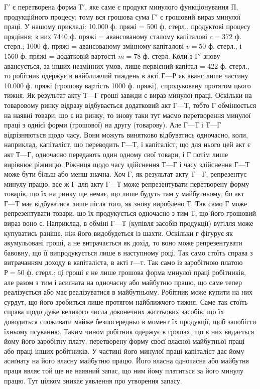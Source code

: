 $Г'$ є перетворена форма $Т'$, яке саме є продукт минулого функціонування
$П$, продукційного процесу; тому вся грошова сума $Г'$ є грошовий
вираз минулої праці. У нашому прикладі: 10.000 ф. пряжі = 500 ф. стерл.,
продуктові процесу прядіння; з них 7440 ф. пряжі = авансованому
сталому капіталові $c = 372$ ф. стерл.; 1000 ф. пряжі = авансованому
змінному капіталові $v = 50$ ф. стерл., і 1560 ф. пряжі = додатковій
вартості $m = 78$ ф. стерл. Коли з $Г'$ знову авансується, за інших незмінних
умов, лише первісний капітал = 422 ф. стерл., то робітник одержує
в найближчий тиждень в акті $Г — Р$ як аванс лише частину 10.000 ф.
пряжі (грошову вартість 1000 ф. пряжі), спродуковану протягом цього
тижня. Як результат акту $Т — Г$ гроші завжди є вираз минулої праці.
Оскільки на товаровому ринку відразу відбувається додатковий акт $Г — Т$,
тобто $Г$ обмінюється на наявні товари, що є на ринку, то знову таки
тут маємо перетворення минулої праці з однієї форми (грошової) на
другу (товарову). Але $Г — Т$ і $Т — Г$ відрізняються щодо часу. Вони
можуть винятково відбуватись одночасно, коли, наприклад, капіталіст,
що переводить $Г — Т$, і капіталіст, що для нього цей акт є акт
$Т — Г$, одночасно передають один одному свої товари, і $Г$ потім лише
вирівнює ріжницю. Ріжниця щодо часу здійснення $Т — Г$ і часу здійснення
$Г — Т$ може бути більш або менш значна. Хоч $Г$, як результат акту
$Т — Г$, репрезентує минулу працю, все ж $Г$ для акту $Г — Т$ може
репрезентувати перетворену форму товарів, що їх на ринку ще немає,
що лише будуть там у майбутньому, бо акт $Г — Т$ має відбуватися
лише після того, як знову вироблено $Т$. Так само $Г$ може
репрезентувати товари, що їх продукується одночасно з тим $Т$, що його
грошовий вираз воно є. Наприклад, в обміні $Г — Т$ (купівля засобів
продукції) вугілля може купуватись раніше, ніж його видобудеться із
шахти. Оскільки $г$ фігурує як акумульовані гроші, а не витрачається
як дохід, то воно може репрезентувати бавовну, що її випродукується
лише в наступному році. Так само стоїть справа з витрачанням доходу
в капіталіста, в акті $г — т$. Так само із заробітною платою $Р = 50$ ф.
стерл.; ці гроші є не лише грошова форма минулої праці робітників, але
разом з тим і асиґната на одночасну або майбутню працю, що
саме тепер реалізується або має реалізуватися в майбутньому. Робітник
може купити на них сурдут, що його зробиться лише протягом найближчого
тижня. Саме так стоїть справа щодо дуже великого числа доконечних
життьових засобів, що їх доводиться споживати майже безпосередньо в
момент їх продукції, щоб запобігти їхньому псуванню. Таким чином
робітник одержує в грошах, що в них видається йому його заробітну плату,
перетворену форму своєї власної майбутньої праці або праці інших робітників.
У частині його минулої праці капіталіст дає йому асиґнату на його
власну майбутню працю. Його власна одночасна або майбутня праця
являє той ще не наявний запас, що ним йому платиться за його минулу
працю. Тут цілком зникає уявлення про утворення запасу.

